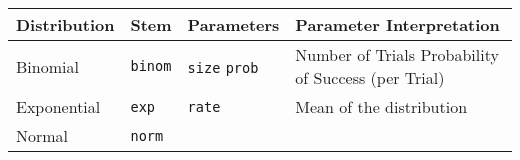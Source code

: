 \documentclass[]{book}
\begin{document}
\begin{longtable}[]{@{}llll@{}}
\toprule
\begin{minipage}[b]{0.16\columnwidth}\raggedright\strut
Distribution\strut
\end{minipage} & \begin{minipage}[b]{0.15\columnwidth}\raggedright\strut
Stem\strut
\end{minipage} & \begin{minipage}[b]{0.17\columnwidth}\raggedright\strut
Parameters\strut
\end{minipage} & \begin{minipage}[b]{0.40\columnwidth}\raggedright\strut
Parameter Interpretation\strut
\end{minipage}\tabularnewline
\midrule
\endhead
\begin{minipage}[t]{0.16\columnwidth}\raggedright\strut
Binomial\strut
\end{minipage} & \begin{minipage}[t]{0.15\columnwidth}\raggedright\strut
\texttt{binom}\strut
\end{minipage} & \begin{minipage}[t]{0.17\columnwidth}\raggedright\strut
\texttt{size} \texttt{prob}\strut
\end{minipage} & \begin{minipage}[t]{0.40\columnwidth}\raggedright\strut
Number of Trials Probability of Success (per Trial)\strut
\end{minipage}\tabularnewline
\begin{minipage}[t]{0.16\columnwidth}\raggedright\strut
Exponential\strut
\end{minipage} & \begin{minipage}[t]{0.15\columnwidth}\raggedright\strut
\texttt{exp}\strut
\end{minipage} & \begin{minipage}[t]{0.17\columnwidth}\raggedright\strut
\texttt{rate}\strut
\end{minipage} & \begin{minipage}[t]{0.40\columnwidth}\raggedright\strut
Mean of the distribution\strut
\end{minipage}\tabularnewline
\begin{minipage}[t]{0.16\columnwidth}\raggedright\strut
Normal\strut
\end{minipage} & \begin{minipage}[t]{0.15\columnwidth}\raggedright\strut
\texttt{norm}\strut
\end{minipage} & \begin{minipage}[t]{0.17\columnwidth}\raggedright\strut

\end{minipage}
\end{longtable}
\end{document}
